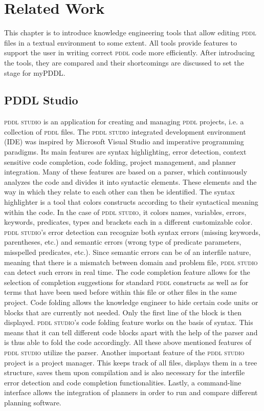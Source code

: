\documentclass[a4paper,12pt]{report}
\newcommand{\mypddl}{\smallerft[0.8]{myPDDL}\xspace}
\newcommand{\pddlstudio}{\textsc{pddl studio}\xspace}
\newcommand\smallerft[2][0.85]{{\scalefont{#1}#2}}
\begin{document}
\chapter{Related Work}
\label{sec-3}
\label{ch:related}

This chapter is to introduce knowledge engineering tools that allow
editing \textsc{pddl} files in a textual environment to some extent.
All tools provide features to support the user in writing correct
\textsc{pddl} code more efficiently. After introducing the tools, they
are compared and their shortcomings are discussed to set the stage for
\mypddl.

\section{PDDL Studio}
\label{sec-3-1}

\pddlstudio \cite{chomuttool,plch2012inspect} is an application for
creating and managing \textsc{pddl} projects, i.e. a collection of
\textsc{pddl} files. The \pddlstudio integrated development
environment (IDE) was inspired by Microsoft Visual Studio
\cite{visstudio} and imperative programming paradigms. Its main
features are syntax highlighting, error detection, context sensitive
code completion, code folding, project management, and planner
integration. Many of these features are based on a parser, which
continuously analyzes the code and divides it into syntactic elements.
These elements and the way in which they relate to each other can then
be identified. The syntax highlighter is a tool that colors constructs
according to their syntactical meaning within the code. In the case of
\pddlstudio, it colors names, variables, errors, keywords, predicates,
types and brackets each in a different customizable color.
\pddlstudio's error detection can recognize both syntax errors
(missing keywords, parentheses, etc.) and semantic errors (wrong type
of predicate parameters, misspelled predicates, etc.). Since semantic
errors can be of an interfile nature, meaning that there is a mismatch
between domain and problem file, \pddlstudio can detect such errors in
real time. The code completion feature allows for the selection of
completion suggestions for standard \textsc{pddl} constructs as well
as for terms that have been used before within this file or other
files in the same project. Code folding allows the knowledge engineer
to hide certain code units or blocks that are currently not needed.
Only the first line of the block is then displayed. \pddlstudio's code folding feature works on the basis of syntax. This means
that it can tell different code blocks apart with the help of the
parser and is thus able to fold the code accordingly. All these above
mentioned features of \pddlstudio utilize the parser. Another
important feature of the \pddlstudio project is a project
manager. This keeps track of all files, displays them in a tree
structure, saves them upon compilation and is also necessary for the
interfile error detection and code completion functionalities. Lastly,
a command-line interface allows the integration of planners in order
to run and compare different planning software.
\end{document}
